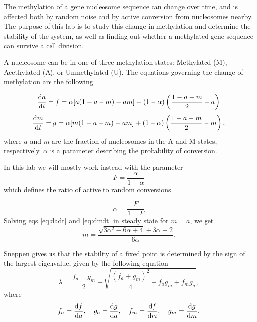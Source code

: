 \documentclass{article}
\begin{document}
The methylation of a gene nucleosome sequence can change over time, and is affected both by random noise and by active conversion from nucleosomes nearby. The purpose of this lab is to study this change in methylation and determine the stability of the system, as well as finding out whether a methylated gene sequence can survive a cell division. 


A nucleosome can be in one of three methylation states: Methylated (M), Acethylated (A), or Unmethylated (U). 
The equations governing the change of methylation are the following

\begin{equation}
	\dv {a}{t} = f = \alpha[a(1-a-m) - am] + (1-\alpha )\left(\frac{1-a-m}{2}  - a\right)
	\label{eq:dadt}
\end{equation}
\begin{equation}
	\dv {m}{t} = g = \alpha[m(1-a-m) - am] + (1-\alpha )\left(\frac{1-a-m}{2}  - m\right),
	\label{eq:dmdt}
\end{equation}
where $a$ and $m$ are the fraction of nucleosomes in the A and M states, respectively. $\alpha$ is a parameter describing the probability of conversion.

In this lab we will mostly work instead with the parameter 
\begin{equation}
	F = \frac{\alpha}{1-\alpha}
	\label{eq:F}
\end{equation}
which defines the ratio of active to random conversions. 


\begin{equation}
	\alpha = \frac{F}{1 + F}
	\label{eq:alpha_of_F}
\end{equation}
Solving eqs \eqref{eq:dadt} and \eqref{eq:dmdt} in steady state for $m=a$, we get 
\begin{equation}
	m = \frac{\sqrt{3\alpha^2 - 6\alpha + 4} + 3\alpha - 2}{6\alpha}.
	\label{eq:m_of_alpha}
\end{equation}


Sneppen \cite{book} gives us that the stability of a fixed point is determined by the sign of the largest eigenvalue, given by the following equation
\begin{equation}
	\lambda = \frac{f_a + g_m}{2}  + \sqrt{\frac{\left(f_a + g_m\right)^2}{4} - f_ag_m + f_mg_a},
	\label{eq:eigen}
\end{equation}
where
\begin{equation}
	f_a = \dv{f}{a},\quad
	g_a = \dv{g}{a},\quad
	f_m = \dv{f}{m},\quad
	g_m = \dv{g}{m}.
\end{equation}
\end{document}
